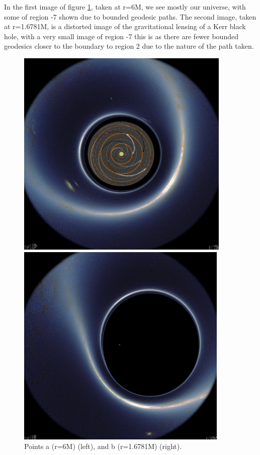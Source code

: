 \documentclass[oneside,openright,frontopenright, singlespacing]{dmathesis}
\begin{document}
\vspace{1em}
	In the first image of figure \ref{fig:Figure6.4}, taken at r=6M, we see mostly our universe, with some of region -7 shown due to bounded geodesic paths. The second image, taken at r=1.6781M, is a distorted image of the gravitational lensing of a Kerr black hole, with a very small image of region -7 this is as there are fewer bounded geodesics closer to the boundary to region 2 due to the nature of the path taken. 

\vspace{1em}
\begin{figure}[!ht]
	\centering
	\begin{minipage}{0.5\textwidth}
		\centering
		\includegraphics[width=0.75\linewidth]{img/plunging1}
	\end{minipage}%
	\hfill
	\begin{minipage}{0.5\textwidth}
		\centering
		\includegraphics[width=0.75\linewidth]{img/plunging2}
	\end{minipage}
	\caption{Points a (r=6M) (left), and b (r=1.6781M) (right).}
	\label{fig:Figure6.4}
\end{figure}
\end{document}
